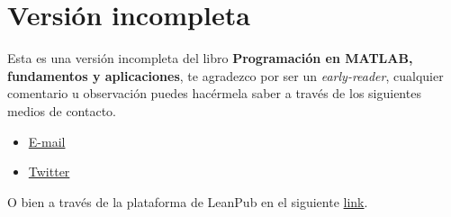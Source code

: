 \chapter*{Versión incompleta}

Esta es una versión incompleta del libro \textbf{Programación en MATLAB,
fundamentos y aplicaciones}, te agradezco por ser un
\emph{early-reader}, cualquier comentario u observación puedes hacérmela
saber a través de los siguientes medios de contacto.

\begin{itemize}
\item
  \href{delossantosmfq@gmail.com}{E-mail}
\item
  \href{https://twitter.com/pjdlsl}{Twitter}
\end{itemize}

O bien a través de la plataforma de LeanPub en el siguiente
\href{https://leanpub.com/programacionmatlab/email_author/new}{link}.